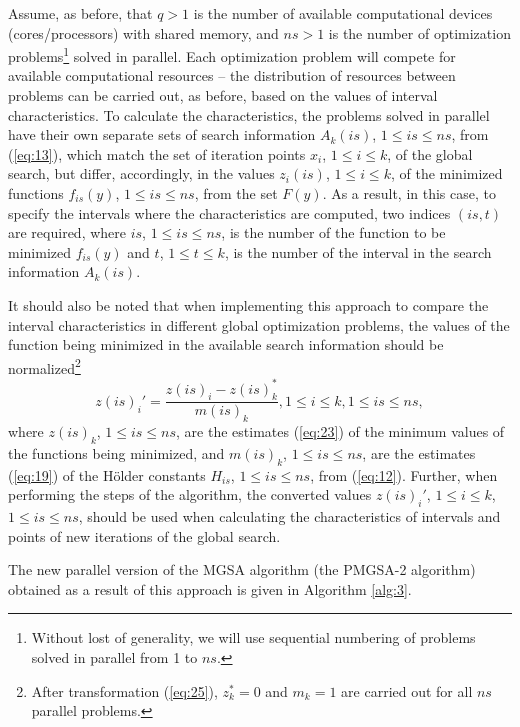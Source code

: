 \documentclass[review]{elsarticle}
\begin{document}
Assume, as before, that $q>1$ is the number of available computational devices (cores/processors) with shared memory, and $ns>1$ is the number of optimization problems\footnote{Without lost of generality, we will use sequential numbering of problems solved in parallel from 1 to $ns$.}  solved in parallel. Each optimization problem will compete for available computational resources -- the distribution of resources between problems can be carried out, as before, based on the values of interval characteristics. To calculate the characteristics, the problems solved in parallel have their own separate sets of search information $A_k (is)$, $1 \leq is \leq ns$, from (\ref{eq:13}), which match the set of iteration points $x_i$, $1 \leq i \leq k$, of the global search, but differ, accordingly, in the values $z_i (is)$, $1 \leq i \leq k$, of the minimized functions $f_{is} (y)$, $1 \leq is \leq ns$, from the set $F(y)$. As a result, in this case, to specify the intervals where the characteristics are computed, two indices $( is, t )$ are required, where $is$, $1 \leq is \leq ns$, is the number of the function to be minimized  $f_{is}(y)$ and  $t$, $1 \leq t \leq k$, is the number of the interval in the search information $A_k (is)$.

It should also be noted that when implementing this approach to compare the interval characteristics in different global optimization problems, the values of the function being minimized in the available search information should be normalized\footnote{After transformation (\ref{eq:25}), $z_k^*=0$ and $m_k=1$ are carried out for all $ns$ parallel problems.}
\begin{equation}\label{eq:25}
z(is)_i'=\frac{z(is)_i - z(is)_k^*}{m(is)_k}, 1 \leq i \leq k,1 \leq is \leq ns,
\end{equation}
where $z(is)_k$, $1 \leq is \leq ns$, are the estimates (\ref{eq:23}) of the minimum values of the functions being minimized, and $m(is)_k$, $1 \leq is \leq ns$, are the estimates (\ref{eq:19}) of the H\"older constants $H_{is}$, $1 \leq is \leq ns$, from (\ref{eq:12}). Further, when performing the steps of the algorithm, the converted values $z(is)_i'$, $1 \leq i \leq k$, $1 \leq is \leq ns$, should be used when calculating the characteristics of intervals and points of new iterations of the global search.

The new parallel version of the MGSA algorithm (the PMGSA-2 algorithm) obtained as a result of this approach is given in Algorithm \ref{alg:3}.
\end{document}
